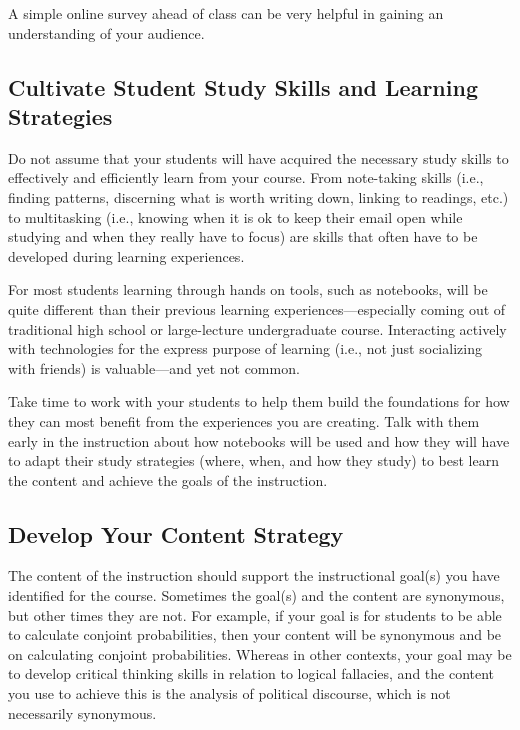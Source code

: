 \documentclass[]{book}
\begin{document}
A simple online survey ahead of class can be very helpful in gaining an
understanding of your audience.

\hypertarget{cultivate-student-study-skills-and-learning-strategies}{%
\subsection{Cultivate Student Study Skills and Learning Strategies}\label{cultivate-student-study-skills-and-learning-strategies}}

Do not assume that your students will have acquired the necessary study skills
to effectively and efficiently learn from your course. From note-taking skills
(i.e., finding patterns, discerning what is worth writing down, linking to
readings, etc.) to multitasking (i.e., knowing when it is ok to keep their email
open while studying and when they really have to focus) are skills that often
have to be developed during learning experiences.

For most students learning through hands on tools, such as notebooks, will be
quite different than their previous learning experiences---especially coming
out of traditional high school or large-lecture undergraduate course.
Interacting actively with technologies for the express purpose of learning
(i.e., not just socializing with friends) is valuable---and yet not common.

Take time to work with your students to help them build the foundations for how
they can most benefit from the experiences you are creating. Talk with them
early in the instruction about how notebooks will be used and how they will have
to adapt their study strategies (where, when, and how they study) to best learn
the content and achieve the goals of the instruction.

\hypertarget{develop-your-content-strategy}{%
\subsection{Develop Your Content Strategy}\label{develop-your-content-strategy}}

The content of the instruction should support the instructional goal(s) you have
identified for the course. Sometimes the goal(s) and the content are synonymous,
but other times they are not. For example, if your goal is for students to be
able to calculate conjoint probabilities, then your content will be synonymous
and be on calculating conjoint probabilities. Whereas in other contexts, your
goal may be to develop critical thinking skills in relation to logical
fallacies, and the content you use to achieve this is the analysis of political
discourse, which is not necessarily synonymous.
\end{document}
